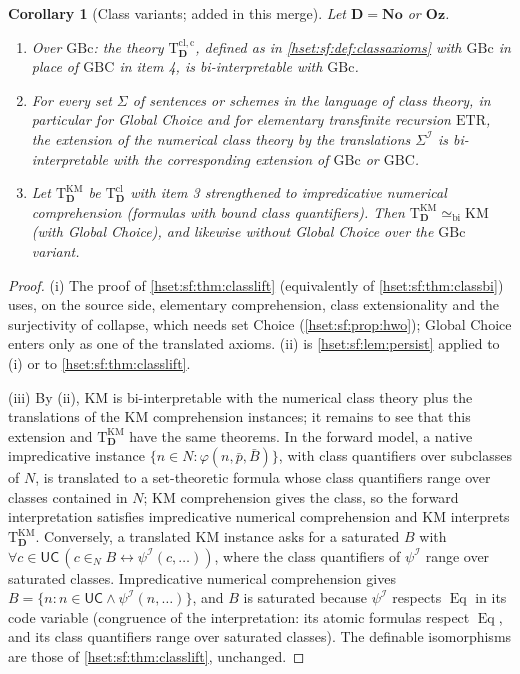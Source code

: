 \documentclass[11pt,letterpaper]{article}
\newtheorem{corollary}[corollary]{Corollary}\aliascntresetthe{corollary}
\theoremstyle{definition}
\theoremstyle{remark}
\newcommand{\No}{\mathbf{No}}
\newcommand{\I}{\mathcal I}
\newcommand{\Oz}{\mathbf{Oz}}
\newcommand{\GBc}{\mathrm{GBc}}
\newcommand{\GBC}{\mathrm{GBC}}
\newcommand{\KM}{\mathrm{KM}}
\newcommand{\ETR}{\mathrm{ETR}}
\newcommand{\Eqc}{\operatorname{Eq}}
\newcommand{\UC}{\mathsf{UC}}
\newcommand{\Dd}{\mathbf{D}}
\newcommand{\Tth}{\mathrm{T}}
\newcommand{\bi}{\simeq_{\mathrm{bi}}}
\begin{document}
\begin{corollary}[Class variants; added in this merge]\label{hset:sf:cor:variants}
Let $\Dd=\No$ or $\Oz$.
\begin{enumerate}[label=(\roman*)]
\item Over $\GBc$: the theory $\Tth^{\mathrm{cl},\mathrm c}_{\Dd}$, defined as in
\cref{hset:sf:def:classaxioms} with $\GBc$ in place of $\GBC$ in item 4, is
bi-interpretable with $\GBc$.
\item For every set $\Sigma$ of sentences or schemes in the language of class
theory, in particular for Global Choice and for elementary transfinite recursion
$\ETR$, the extension of the numerical class theory by the translations
$\Sigma^{\I}$ is bi-interpretable with the corresponding extension of $\GBc$ or
$\GBC$.
\item Let $\Tth^{\mathrm{KM}}_{\Dd}$ be $\Tth^{\mathrm{cl}}_{\Dd}$ with item 3
strengthened to \emph{impredicative} numerical comprehension (formulas with bound
class quantifiers). Then $\Tth^{\mathrm{KM}}_{\Dd}\bi\KM$ (with Global Choice), and
likewise without Global Choice over the $\GBc$ variant.
\end{enumerate}
\end{corollary}
\begin{proof}
(i) The proof of \cref{hset:sf:thm:classlift} (equivalently of
\cref{hset:sf:thm:classbi}) uses, on the source side, elementary comprehension,
class extensionality and the surjectivity of collapse, which needs set Choice
(\cref{hset:sf:prop:hwo}); Global Choice enters only as one of the translated axioms.
(ii) is \cref{hset:sf:lem:persist} applied to (i) or to
\cref{hset:sf:thm:classlift}.

(iii) By (ii), $\KM$ is bi-interpretable with the numerical class theory plus the
translations of the $\KM$ comprehension instances; it remains to see that this
extension and $\Tth^{\mathrm{KM}}_{\Dd}$ have the same theorems. In the forward
model, a native impredicative instance $\{n\in N:\varphi(n,\bar p,\bar B)\}$, with
class quantifiers over subclasses of $N$, is translated to a set-theoretic formula
whose class quantifiers range over classes contained in $N$; $\KM$ comprehension
gives the class, so the forward interpretation satisfies impredicative numerical
comprehension and $\KM$ interprets $\Tth^{\mathrm{KM}}_{\Dd}$. Conversely, a
translated $\KM$ instance asks for a saturated $B$ with
$\forall c\in\UC\,(c\in_NB\leftrightarrow\psi^{\I}(c,\ldots))$, where the class
quantifiers of $\psi^{\I}$ range over saturated classes. Impredicative numerical
comprehension gives $B=\{n:n\in\UC\land\psi^{\I}(n,\ldots)\}$, and $B$ is saturated
because $\psi^{\I}$ respects $\Eqc$ in its code variable (congruence of the
interpretation: its atomic formulas respect $\Eqc$, and its class quantifiers range
over saturated classes). The definable isomorphisms are those of
\cref{hset:sf:thm:classlift}, unchanged.
\end{proof}
\end{document}
